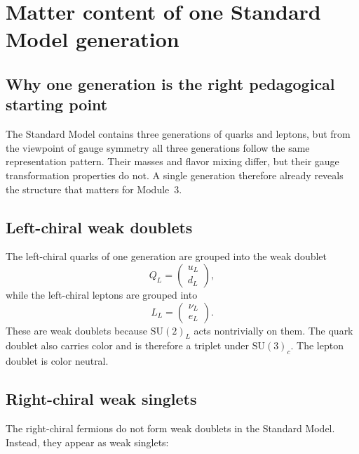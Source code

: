 \documentclass[11pt,a4paper]{article}
\newcommand{\SUc}{\mathrm{SU}(3)_c}
\newcommand{\SUw}{\mathrm{SU}(2)_L}
\begin{document}
\section{Matter content of one Standard Model generation}

\subsection{Why one generation is the right pedagogical starting point}

The Standard Model contains three generations of quarks and leptons, but from the viewpoint of gauge symmetry all three generations follow the same representation pattern. Their masses and flavor mixing differ, but their gauge transformation properties do not. A single generation therefore already reveals the structure that matters for Module~3.



\subsection{Left-chiral weak doublets}

The left-chiral quarks of one generation are grouped into the weak doublet
\begin{equation}
Q_L=\begin{pmatrix}u_L\\ d_L\end{pmatrix},
\label{eq:QL-doublet-expanded}
\end{equation}
while the left-chiral leptons are grouped into
\begin{equation}
L_L=\begin{pmatrix}\nu_L\\ e_L\end{pmatrix}.
\label{eq:LL-doublet-expanded}
\end{equation}
These are weak doublets because \(\SUw\) acts nontrivially on them. The quark doublet also carries color and is therefore a triplet under \(\SUc\). The lepton doublet is color neutral.




\subsection{Right-chiral weak singlets}

The right-chiral fermions do not form weak doublets in the Standard Model. Instead, they appear as weak singlets:
\end{document}
